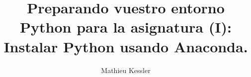\documentclass[9pt]{beamer}
\begin{document}
\lstset{language=Python}
\title{Preparando vuestro entorno Python para la asignatura (I):\\
  Instalar Python usando Anaconda.}

\author[Mathieu Kessler]{Mathieu Kessler}

\begin{frame}
  \titlepage
\end{frame}
\end{document}
